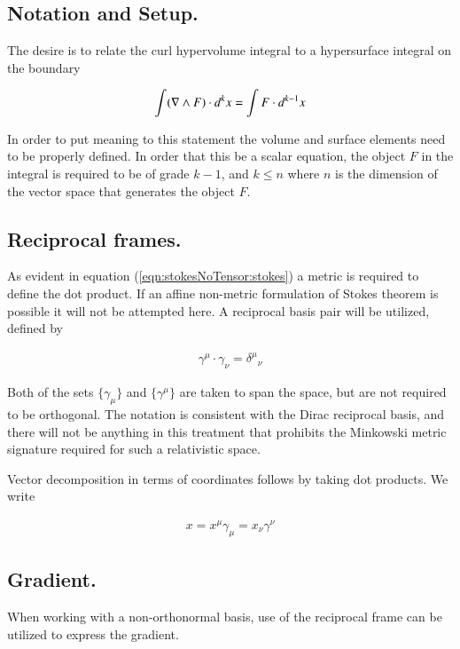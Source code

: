 \subsection{Notation and Setup.}

The desire is to relate the curl hypervolume integral to a hypersurface integral on the boundary

\begin{align}\label{eqn:stokesNoTensor:stokes}
\int (\nabla \wedge F) \cdot d^k x = \int F \cdot d^{k-1} x
\end{align}

In order to put meaning to this statement the volume and surface elements need to be properly defined.  In order that this be a scalar equation, the object $F$ in the integral is required to be of grade $k-1$, and $k \le n$ where $n$ is the dimension of the vector space that generates the object $F$.

\subsection{Reciprocal frames.}

As evident in equation (\ref{eqn:stokesNoTensor:stokes}) a metric is required to define the dot product.  If an affine non-metric formulation
of Stokes theorem is possible it will not be attempted here.  A reciprocal basis pair will be utilized, defined by

\begin{align}
\gamma^\mu \cdot \gamma_\nu = {\delta^\mu}_\nu
\end{align}

Both of the sets $\{\gamma_\mu\}$ and $\{\gamma^\mu\}$ are taken to span the space, but are not required to be orthogonal.  The notation is consistent with the Dirac reciprocal basis, and there will not be anything in this treatment that prohibits the Minkowski metric signature required for such a relativistic space.

Vector decomposition in terms of coordinates follows by taking dot products.  We write

\begin{align}
x = x^\mu \gamma_\mu = x_\nu \gamma^\nu
\end{align}

\subsection{Gradient.}

When working with a non-orthonormal basis, use of the reciprocal frame can be utilized to express the gradient.

